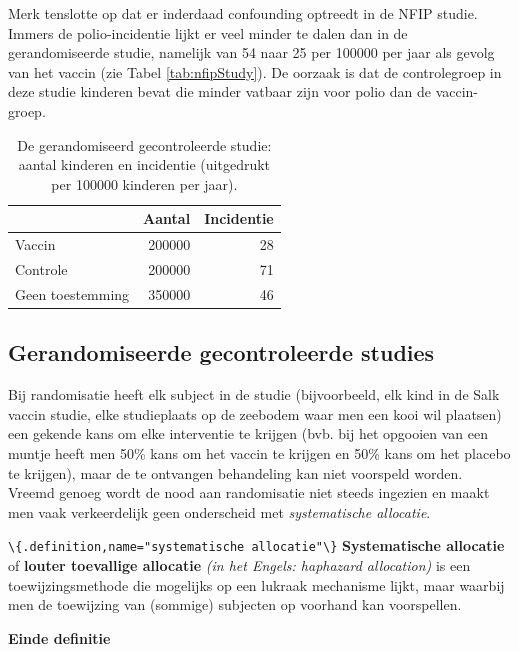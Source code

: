 \documentclass[
  12pt,dutch,coursenotes]{book}
\newcommand{\passthrough}[1]{#1}
\begin{document}
Merk tenslotte op dat er inderdaad confounding optreedt in de NFIP studie. Immers
de polio-incidentie lijkt er veel minder te dalen dan in de gerandomiseerde studie, namelijk van 54 naar 25
per 100000 per jaar als gevolg van het vaccin (zie Tabel \ref{tab:nfipStudy}). De oorzaak is dat
de controlegroep in deze studie kinderen bevat die minder vatbaar zijn voor
polio dan de vaccin-groep.

\begin{table}

\caption{\label{tab:dbrcStudy}De gerandomiseerd gecontroleerde studie: aantal kinderen en incidentie (uitgedrukt per
100000 kinderen per jaar).}
\centering
\begin{tabular}[t]{lrr}
\toprule
  & Aantal & Incidentie\\
\midrule
Vaccin & 200000 & 28\\
Controle & 200000 & 71\\
Geen toestemming & 350000 & 46\\
\bottomrule
\end{tabular}
\end{table}

\hypertarget{gerandomiseerde-gecontroleerde-studies}{%
\subsection{Gerandomiseerde gecontroleerde studies}\label{gerandomiseerde-gecontroleerde-studies}}

Bij randomisatie heeft elk subject in de studie (bijvoorbeeld, elk kind in de Salk vaccin studie, elke studieplaats op de zeebodem waar men een kooi wil plaatsen) een gekende kans om elke interventie te krijgen (bvb. bij het opgooien van een muntje heeft men 50\% kans om het
vaccin te krijgen en 50\% kans om het placebo te krijgen), maar de te
ontvangen behandeling kan niet voorspeld worden. Vreemd genoeg wordt de nood
aan randomisatie niet steeds ingezien en maakt men vaak verkeerdelijk geen
onderscheid met \emph{systematische allocatie}.

\passthrough{\lstinline!\{.definition,name="systematische allocatie"\}!}
\textbf{Systematische allocatie} of \textbf{louter toevallige allocatie}
\emph{(in het Engels: haphazard allocation)} is een toewijzingsmethode die
mogelijks op een lukraak mechanisme lijkt, maar waarbij men de toewijzing
van (sommige) subjecten op voorhand kan voorspellen.

\textbf{Einde definitie}
\end{document}
